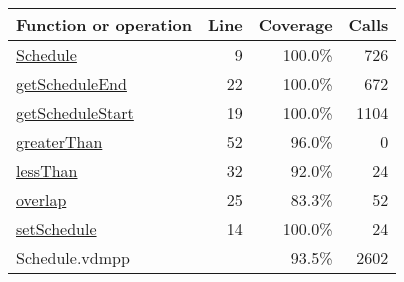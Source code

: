 \bigskip
\begin{longtable}{|l|r|r|r|}
\hline
Function or operation & Line & Coverage & Calls \\
\hline
\hline
\hyperref[Schedule:9]{Schedule} & 9&100.0\% & 726 \\
\hline
\hyperref[getScheduleEnd:22]{getScheduleEnd} & 22&100.0\% & 672 \\
\hline
\hyperref[getScheduleStart:19]{getScheduleStart} & 19&100.0\% & 1104 \\
\hline
\hyperref[greaterThan:52]{greaterThan} & 52&96.0\% & 0 \\
\hline
\hyperref[lessThan:32]{lessThan} & 32&92.0\% & 24 \\
\hline
\hyperref[overlap:25]{overlap} & 25&83.3\% & 52 \\
\hline
\hyperref[setSchedule:14]{setSchedule} & 14&100.0\% & 24 \\
\hline
\hline
Schedule.vdmpp & & 93.5\% & 2602 \\
\hline
\end{longtable}

